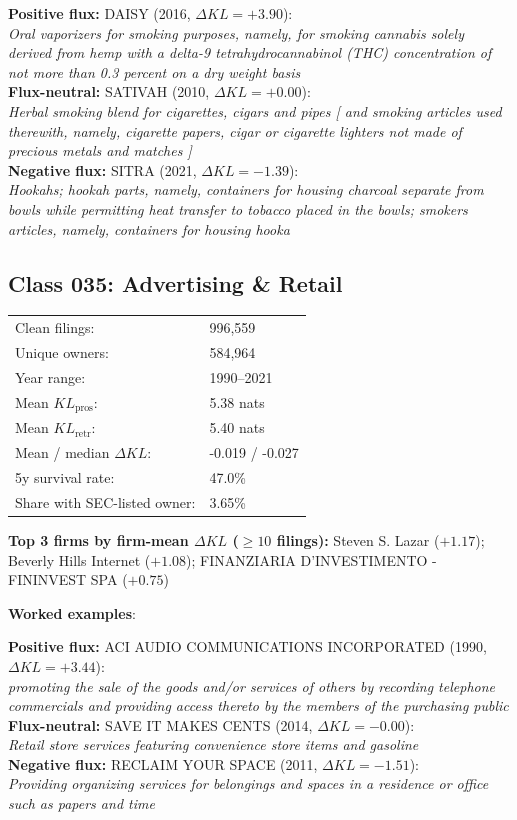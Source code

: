   \textbf{Positive flux:} \textsc{DAISY} (2016, $\Delta KL=+3.90$):\\
  \textit{Oral vaporizers for smoking purposes, namely, for smoking cannabis solely derived from hemp with a delta-9 tetrahydrocannabinol (THC) concentration of not more than 0.3 percent on a dry weight basis}\\
  \textbf{Flux-neutral:} \textsc{SATIVAH} (2010, $\Delta KL=+0.00$):\\
  \textit{Herbal smoking blend for cigarettes, cigars and pipes [ and smoking articles used therewith, namely, cigarette papers, cigar or cigarette lighters not made of precious metals and matches ]}\\
  \textbf{Negative flux:} \textsc{SITRA} (2021, $\Delta KL=-1.39$):\\
  \textit{Hookahs; hookah parts, namely, containers for housing charcoal separate from bowls while permitting heat transfer to tobacco placed in the bowls; smokers articles, namely, containers for housing hooka}\\

\subsection*{Class 035: Advertising \& Retail}
\label{app:industry-035}

\begin{tabular}{ll}
Clean filings: & 996,559 \\
Unique owners: & 584,964 \\
Year range: & 1990--2021 \\
Mean $KL_\text{pros}$: & 5.38 nats \\
Mean $KL_\text{retr}$: & 5.40 nats \\
Mean / median $\Delta KL$: & -0.019 / -0.027 \\
5y survival rate: & 47.0\% \\
Share with SEC-listed owner: & 3.65\% \\
\end{tabular}

\textbf{Top 3 firms by firm-mean $\Delta KL$ ($\geq 10$ filings):} Steven S. Lazar ($+1.17$); Beverly Hills Internet ($+1.08$); FINANZIARIA D'INVESTIMENTO - FININVEST SPA ($+0.75$)

\textbf{Worked examples}:

  \textbf{Positive flux:} \textsc{ACI AUDIO COMMUNICATIONS INCORPORATED} (1990, $\Delta KL=+3.44$):\\
  \textit{promoting the sale of the goods and/or services of others by recording telephone commercials and providing access thereto by the members of the purchasing public}\\
  \textbf{Flux-neutral:} \textsc{SAVE IT MAKES CENTS} (2014, $\Delta KL=-0.00$):\\
  \textit{Retail store services featuring convenience store items and gasoline}\\
  \textbf{Negative flux:} \textsc{RECLAIM YOUR SPACE} (2011, $\Delta KL=-1.51$):\\
  \textit{Providing organizing services for belongings and spaces in a residence or office such as papers and time}\\

